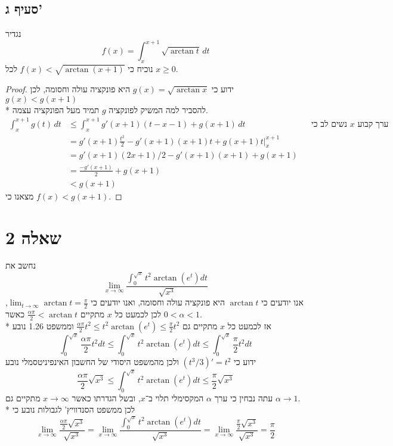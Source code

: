 \subsection{סעיף ג'}
נגדיר
\[
	f(x) = \int_{x}^{x + 1} \sqrt{\arctan t} \, dt
\]
נוכיח כי $f(x) < \sqrt{\arctan(x + 1)}$ לכל $x \ge 0$.
\begin{proof}
	ידוע כי $g(x) = \sqrt{\arctan x}$ היא פונקציה עולה וחסומה, לכן $g(x) < g(x + 1)$ \\*
	להסביר למה המשיק לפונקציה $g$ תמיד מעל הפונקציה עצמה.
	\begin{align*}
		\int_{x}^{x + 1} g(t) \, dt
		& \le
		\int_{x}^{x + 1} g'(x + 1)(t - x - 1) + g(x + 1) \, dt && \text{נשים לב כי $x$ ערך קבוע באינטגרל} \\
		& = g'(x + 1) \frac{t^2}{2} - g'(x + 1)(x + 1)t + g(x + 1) t \Big|_x^{x + 1} \\
		& = g'(x + 1) (2x + 1)/2 - g'(x + 1) (x + 1) + g(x + 1) \\
		& = \frac{-g'(x + 1)}{2} + g(x + 1) \\
		& < g(x + 1)
	\end{align*}
	מצאנו כי $f(x) < g(x + 1)$.
\end{proof}

\section{שאלה 2}
נחשב את
\[
	\lim_{x \to \infty} \frac{\displaystyle\int_0^{\sqrt{x}} t^2 \arctan(e^t) dt}{\sqrt{x^3}}
\]
אנו יודעים כי $\arctan t$ היא פונקציה עולה וחסומה, ואנו יודעים כי $\lim_{t \to \infty} \arctan t = \frac{\pi}{2}$,
לכן לכמעט כל $x$ מתקיים $\frac{\alpha \pi}{2} < \arctan{t}$ כאשר $0 < \alpha < 1$. \\*
אז לכמעט כל $x$ מתקיים גם $\frac{\alpha \pi}{2} t^2 \le t^2 \arctan(e^t) \le \frac{\pi}{2} t^2$ וממשפט 1.26 נובע
\[
	\int_0^{\sqrt{x}} \frac{\alpha \pi}{2} t^2 dt
	\le \int_0^{\sqrt{x}} t^2 \arctan(e^t) dt
	\le \int_0^{\sqrt{x}} \frac{\pi}{2} t^2 dt
\]
ידוע כי $(t^3/3)' = t^2$ ולכן מהמשפט היסודי של החשבון האינפיניטסמלי נובע
\[
	\frac{\alpha \pi}{2} \sqrt{x^3}
	\le \int_0^{\sqrt{x}} t^2 \arctan(e^t) dt
	\le \frac{\pi}{2} \sqrt{x^3}
\]
עתה נבחין כי ערך $\alpha$ המקסימלי תלוי ב־$x$, ובשל הגדרתו כאשר $x \to \infty$ מתקיים גם $\alpha \to 1$. \\*
לכן ממשפט הסנדוויץ' לגבולות נובע כי
\[
	\lim_{x \to \infty} \frac{\frac{\alpha \pi}{2} \sqrt{x^3}}{\sqrt{x^3}}
	= \lim_{x \to \infty} \frac{\int_0^{\sqrt{x}} t^2 \arctan(e^t) dt}{\sqrt{x^3}}
	= \lim_{x \to \infty} \frac{\frac{\pi}{2} \sqrt{x^3}}{\sqrt{x^3}} = \frac{\pi}{2}
\]

